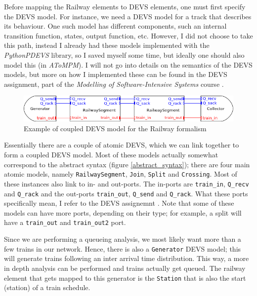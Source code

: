 \documentclass{article}
\begin{document}
Before mapping the Railway elements to DEVS elements, one must first specify the DEVS model. For instance, we need a DEVS model for a track that describes its behaviour. One such model has different components, such an internal transition function, states, output function, etc. However, I did not choose to take this path, instead I already had these models implemented with the \textit{PythonPDEVS} library, so I saved myself some time, but ideally one should also model this (in \textit{AToMPM}). I will not go into details on the semantics of the DEVS models, but more on how I implemented these can be found in the DEVS assignment, part of the \textit{Modelling of Software-Intensive Systems} course \cite{devs_assignment}.

\begin{figure}[H]
    \centering
    \includegraphics[width=\textwidth]{images/devs_overview.png}
    \caption{Example of coupled DEVS model for the Railway formalism \cite{devs_assignment}}
    \label{coupled_devs_example}
\end{figure}

Essentially there are a couple of atomic DEVS, which we can link together to form a coupled DEVS model. Most of these models actually somewhat correspond to the abstract syntax (figure \ref{abstract_syntax}); there are four main atomic models, namely \texttt{RailwaySegment}, \texttt{Join}, \texttt{Split} and \texttt{Crossing}. Most of these instances also link to in- and out-ports. The in-ports are \texttt{train\_in}, \texttt{Q\_recv} and \texttt{Q\_rack} and the out-ports \texttt{train\_out}, \texttt{Q\_send} and \texttt{Q\_rack}. What these ports specifically mean, I refer to the DEVS assignemnt \cite{devs_assignment}. Note that some of these models can have more ports, depending on their type; for example, a split will have a \texttt{train\_out} and \texttt{train\_out2} port.

Since we are performing a queueing analysis, we most likely want more than a few trains in our network. Hence, there is also a \texttt{Generator} DEVS model; this will generate trains following an inter arrival time distribution. This way, a more in depth analysis can be performed and trains actually get queued. The railway element that gets mapped to this generator is the \texttt{Station} that is also the start (station) of a train schedule.
\end{document}
